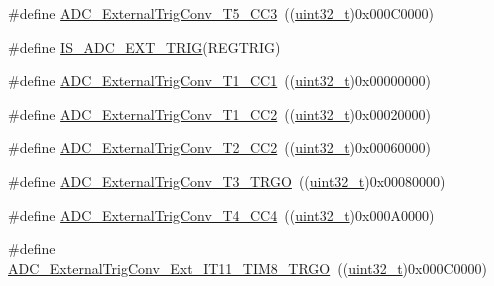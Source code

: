 \begin{DoxyCompactItemize}
\item 
\#define \hyperlink{group___a_d_c__external__trigger__sources__for__regular__channels__conversion_ga95b58981aff35d6d5fa229925cd6315d}{A\+D\+C\+\_\+\+External\+Trig\+Conv\+\_\+\+T5\+\_\+\+C\+C3}~((\hyperlink{_p_e___types_8h_a33594304e786b158f3fb30289278f5af}{uint32\+\_\+t})0x000\+C0000)
\item 
\#define \hyperlink{group___a_d_c__external__trigger__sources__for__regular__channels__conversion_gac74e6054adbedd72822cacde69105318}{I\+S\+\_\+\+A\+D\+C\+\_\+\+E\+X\+T\+\_\+\+T\+R\+IG}(R\+E\+G\+T\+R\+IG)
\item 
\#define \hyperlink{group___a_d_c__external__trigger__sources__for__regular__channels__conversion_ga303f24361ea930f8214e9e68b63b244e}{A\+D\+C\+\_\+\+External\+Trig\+Conv\+\_\+\+T1\+\_\+\+C\+C1}~((\hyperlink{_p_e___types_8h_a33594304e786b158f3fb30289278f5af}{uint32\+\_\+t})0x00000000)
\item 
\#define \hyperlink{group___a_d_c__external__trigger__sources__for__regular__channels__conversion_ga8bf9fd9ad4e4c12ef41520ded2c3c332}{A\+D\+C\+\_\+\+External\+Trig\+Conv\+\_\+\+T1\+\_\+\+C\+C2}~((\hyperlink{_p_e___types_8h_a33594304e786b158f3fb30289278f5af}{uint32\+\_\+t})0x00020000)
\item 
\#define \hyperlink{group___a_d_c__external__trigger__sources__for__regular__channels__conversion_gadfeb40c1735b0ee50f8a5aafdd840cc6}{A\+D\+C\+\_\+\+External\+Trig\+Conv\+\_\+\+T2\+\_\+\+C\+C2}~((\hyperlink{_p_e___types_8h_a33594304e786b158f3fb30289278f5af}{uint32\+\_\+t})0x00060000)
\item 
\#define \hyperlink{group___a_d_c__external__trigger__sources__for__regular__channels__conversion_ga1cf4549534a00fe2f5527ad783204098}{A\+D\+C\+\_\+\+External\+Trig\+Conv\+\_\+\+T3\+\_\+\+T\+R\+GO}~((\hyperlink{_p_e___types_8h_a33594304e786b158f3fb30289278f5af}{uint32\+\_\+t})0x00080000)
\item 
\#define \hyperlink{group___a_d_c__external__trigger__sources__for__regular__channels__conversion_ga8f6a764b7de878c2e09bbb0d1061d69c}{A\+D\+C\+\_\+\+External\+Trig\+Conv\+\_\+\+T4\+\_\+\+C\+C4}~((\hyperlink{_p_e___types_8h_a33594304e786b158f3fb30289278f5af}{uint32\+\_\+t})0x000\+A0000)
\item 
\#define \hyperlink{group___a_d_c__external__trigger__sources__for__regular__channels__conversion_ga640de59aeac8cc3d96b6db3497975d02}{A\+D\+C\+\_\+\+External\+Trig\+Conv\+\_\+\+Ext\+\_\+\+I\+T11\+\_\+\+T\+I\+M8\+\_\+\+T\+R\+GO}~((\hyperlink{_p_e___types_8h_a33594304e786b158f3fb30289278f5af}{uint32\+\_\+t})0x000\+C0000)

\end{DoxyCompactItemize}
